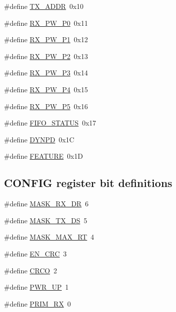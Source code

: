 \begin{DoxyCompactItemize}
\item 
\#define \hyperlink{group__nordic__hal__nrf__reg_gaa734c6e08b9f794436eacbabe466a6c4}{TX\_\-ADDR}~0x10
\item 
\#define \hyperlink{group__nordic__hal__nrf__reg_ga060e61d8f6e7ad28984540faa85cdecf}{RX\_\-PW\_\-P0}~0x11
\item 
\#define \hyperlink{group__nordic__hal__nrf__reg_gaa260ec97512905cec17f8ade82bc550d}{RX\_\-PW\_\-P1}~0x12
\item 
\#define \hyperlink{group__nordic__hal__nrf__reg_ga38a4904a52517c8d339c689230a6567d}{RX\_\-PW\_\-P2}~0x13
\item 
\#define \hyperlink{group__nordic__hal__nrf__reg_ga44bdf6946c1ae047ea2a2c981244d4d8}{RX\_\-PW\_\-P3}~0x14
\item 
\#define \hyperlink{group__nordic__hal__nrf__reg_ga5cdda00ab52df1537b6b5d61ef88ba8f}{RX\_\-PW\_\-P4}~0x15
\item 
\#define \hyperlink{group__nordic__hal__nrf__reg_ga9ce52902779e18d4fed3685b0f8be582}{RX\_\-PW\_\-P5}~0x16
\item 
\#define \hyperlink{group__nordic__hal__nrf__reg_ga9e5c9878194f462bf7a46ca8a7b8f9d2}{FIFO\_\-STATUS}~0x17
\item 
\#define \hyperlink{group__nordic__hal__nrf__reg_gae79cde384e0b6a5549efb001589a79ec}{DYNPD}~0x1C
\item 
\#define \hyperlink{group__nordic__hal__nrf__reg_gadf81f7b30b6c08465ce704956b446a2d}{FEATURE}~0x1D
\end{DoxyCompactItemize}
\subsection*{CONFIG register bit definitions}
\begin{DoxyCompactItemize}
\item 
\#define \hyperlink{group__nordic__hal__nrf__reg_ga5f30d66a7a448dc83fd695dbd3efbe31}{MASK\_\-RX\_\-DR}~6
\item 
\#define \hyperlink{group__nordic__hal__nrf__reg_gad5f819a0030605463504bd2599579b4c}{MASK\_\-TX\_\-DS}~5
\item 
\#define \hyperlink{group__nordic__hal__nrf__reg_ga13e9f541027a36c23211d6c8f3b33a92}{MASK\_\-MAX\_\-RT}~4
\item 
\#define \hyperlink{group__nordic__hal__nrf__reg_gaece57618cf42f6b1b520341ef19a66f8}{EN\_\-CRC}~3
\item 
\#define \hyperlink{group__nordic__hal__nrf__reg_ga253dd73b17f0ea7f71e55f52e796836a}{CRCO}~2
\item 
\#define \hyperlink{group__nordic__hal__nrf__reg_gaf0dbd9e4c17ba0db357fcb2cedd4aa6d}{PWR\_\-UP}~1
\item 
\#define \hyperlink{group__nordic__hal__nrf__reg_ga0b4d92f3ecccb150d4cb1cb5d0f9d4e6}{PRIM\_\-RX}~0
\end{DoxyCompactItemize}
